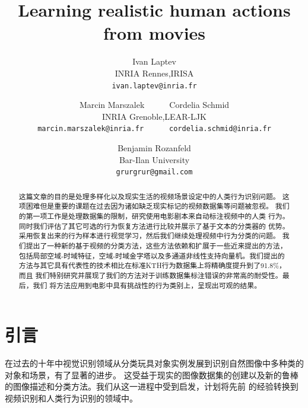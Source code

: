 \documentclass[10pt,twocolumn,letterpaper]{article}
\begin{document}
\title{Learning realistic human actions from movies\\}

\author{Ivan Laptev\\
INRIA Rennes,IRISA\\
{\tt\small ivan.laptev@inria.fr}
\and
Marcin Marszalek~~~~~~Cordelia Schmid\\
INRIA Grenoble,LEAR-LJK\\
{\tt\small marcin.marszalek@inria.fr~~~~~~cordelia.schmid@inria.fr}
\and
Benjamin Rozanfeld\\
Bar-Ilan University\\
{\tt\small grurgrur@gmail.com}
}

\maketitle

\begin{abstract}
   这篇文章的目的是处理多样化以及现实生活的视频场景设定中的人类行为识别问题。
   这项困难但是重要的课题在过去因为诸如缺乏现实标记的视频数据集等问题被忽视。
   我们的第一项工作是处理数据集的限制，研究使用电影剧本来自动标注视频中的人类
   行为。同时我们评估了其它可选的行为恢复方法进行比较并展示了基于文本的分类器的
   优势。采用恢复出来的行为样本进行视觉学习，然后我们继续处理视频中行为分类的问题。
   我们提出了一种新的基于视频的分类方法，这些方法依赖和扩展于一些近来提出的方法，
   包括局部空域-时域特征，空域-时域金字塔以及多通道非线性支持向量机。我们提出的
   方法与其它具有代表性的技术相比在标准KTH行为数据集上将精确度提升到了91.8\%，而且
   我们特别研究并展现了我们的方法对于训练数据集标注错误的非常高的耐受性。最后，我们
   将方法应用到电影中具有挑战性的行为类别上，呈现出可观的结果。
\end{abstract}

\section{引言}
在过去的十年中视觉识别领域从分类玩具对象实例发展到识别自然图像中多种类的对象和场景，有了显著的进步。
这受益于现实的图像数据集的创建以及新的鲁棒的图像描述和分类方法。我们从这一进程中受到启发，计划将先前
的经验转换到视频识别和人类行为识别的领域中。
\end{document}
